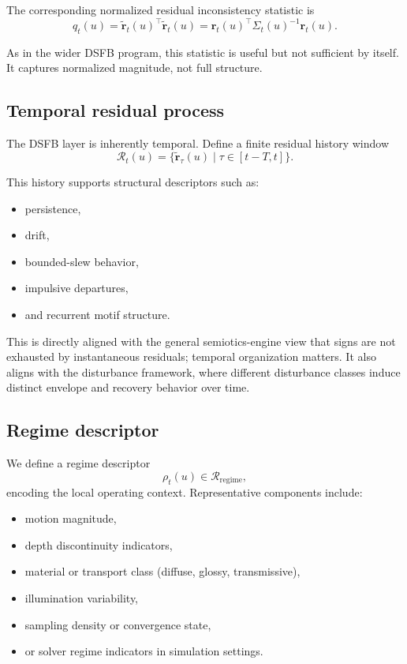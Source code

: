 \documentclass[11pt,letterpaper]{article}
\theoremstyle{gcresult}
\theoremstyle{definition}
\begin{document}
The corresponding normalized residual inconsistency statistic is
\begin{equation}
q_t(u)=\tilde{\mathbf r}_t(u)^\top \tilde{\mathbf r}_t(u)
=
\mathbf r_t(u)^\top \Sigma_t(u)^{-1}\mathbf r_t(u).
\end{equation}

As in the wider DSFB program, this statistic is useful but not sufficient by itself. It captures normalized magnitude, not full structure.


\subsection{Temporal residual process}

The DSFB layer is inherently temporal. Define a finite residual history window
\begin{equation}
\mathcal R_t(u)=\{\tilde{\mathbf r}_\tau(u)\mid \tau\in[t-T,t]\}.
\end{equation}

This history supports structural descriptors such as:
\begin{itemize}[leftmargin=1.5em]
    \item persistence,
    \item drift,
    \item bounded-slew behavior,
    \item impulsive departures,
    \item and recurrent motif structure.
\end{itemize}

This is directly aligned with the general semiotics-engine view that signs are not exhausted by instantaneous residuals; temporal organization matters. It also aligns with the disturbance framework, where different disturbance classes induce distinct envelope and recovery behavior over time. 


\subsection{Regime descriptor}

We define a regime descriptor
\begin{equation}
\rho_t(u)\in\mathcal R_{\mathrm{regime}},
\end{equation}
encoding the local operating context. Representative components include:
\begin{itemize}[leftmargin=1.5em]
    \item motion magnitude,
    \item depth discontinuity indicators,
    \item material or transport class (diffuse, glossy, transmissive),
    \item illumination variability,
    \item sampling density or convergence state,
    \item or solver regime indicators in simulation settings.
\end{itemize}
\end{document}
